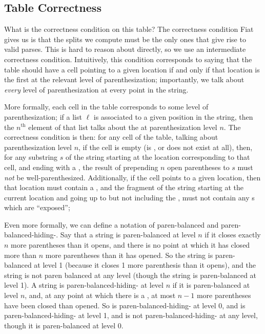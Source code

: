     
  \subsection{Table Correctness}
    What is the correctness condition on this table?  The correctness condition Fiat gives us is that the splits we compute must be the only ones that give rise to valid parses.  This is hard to reason about directly, so we use an intermediate correctness condition.  Intuitively, this condition corresponds to saying that the table should have a cell pointing to a given location if and only if that location is the first \terminal{+} at the relevant level of parenthesization; importantly, we talk about \emph{every} level of parenthesization at every point in the string.
    
    More formally, each cell in the table corresponds to some level of parenthesization; if a list $\ell$ is associated to a given position in the string, then the $n^{\text{th}}$ element of that list talks about the \terminal{+} at parenthesization level $n$.  The correctness condition is then: for any cell of the table, talking about parenthesization level $n$, if the cell is empty (is \nullentry, or does not exist at all), then, for any substring $s$ of the string starting at the location corresponding to that cell, and ending with a \terminal{+}, the result of prepending $n$ open parentheses to $s$ must \emph{not} be well-parenthesized.  %
    Additionally, if the cell points to a given location, then that location must contain a \terminal{+}, and the fragment of the string starting at the current location and going up to but not including the \terminal{+}, must not contain any \terminal{+}s which are ``exposed''; 
    
    Even more formally, we can define a notation of paren-balanced and paren-balanced-hiding-\terminal{+}.  Say that a string is paren-balanced at level $n$ if it closes exactly $n$ more parentheses than it opens, and there is no point at which it has closed more than $n$ more parentheses than it has opened.  So the string  is paren-balanced at level 1 (because it closes 1 more parenthesis than it opens), and the string  is not paren balanced at any level (though the string  is paren-balanced at level 1).  A string is paren-balanced-hiding-\terminal{+} at level $n$ if it is paren-balanced at level $n$, and, at any point at which there is a \terminal{+}, at most $n-1$ more parentheses have been closed than opened.  So  is paren-balanced-hiding-\terminal{+} at level 0, and  is paren-balanced-hiding-\terminal{+} at level 1, and  is not paren-balanced-hiding-\terminal{+} at any level, though it is paren-balanced at level 0. %
    
